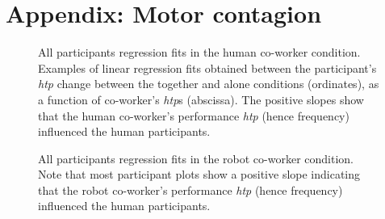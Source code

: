 \chapter{Appendix: Motor contagion}



\begin{figure}[hpt]
	\caption{All participants regression fits in the human co-worker condition. Examples of linear regression fits obtained between the participant's {\it htp} change between the together and alone conditions (ordinates), as a function of co-worker's {\it htp}s (abscissa). The positive slopes show that the human co-worker's performance {\it htp} (hence frequency) influenced the human participants.}
	\label{S2_Fig}
\end{figure}


\begin{figure}
	\caption{All participants regression fits in the robot co-worker condition. Note that most participant plots show a positive slope indicating that the robot co-worker's performance {\it htp} (hence frequency) influenced the human participants.}
	\label{S1_Fig}
\end{figure}



